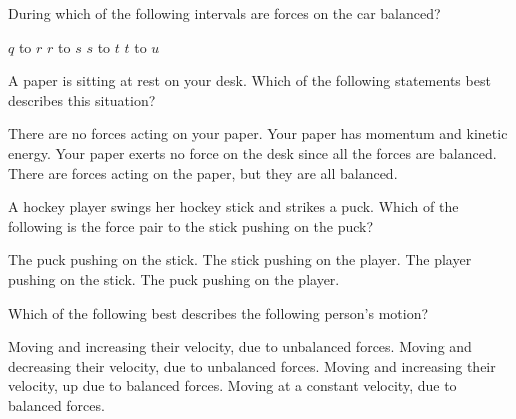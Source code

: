 \documentclass[answers]{exam}
\begin{document}
\begin{questions}
During which of the following intervals are forces on the car balanced?

\begin{randomizeoneparchoices}[norandomize]
    \choice $q$ to $r$
    \choice $r$ to $s$
    \correctchoice $s$ to $t$
    \choice $t$ to $u$
\end{randomizeoneparchoices}

\question 
A paper is sitting at rest on your desk.  Which of the following statements best describes this situation?

\begin{randomizechoices}[norandomize]
    \choice There are no forces acting on your paper.
    \choice Your paper has momentum and kinetic energy.
    \choice Your paper exerts no force on the desk since all the forces are balanced.
    \correctchoice There are forces acting on the paper, but they are all balanced.
\end{randomizechoices}

\question
A hockey player swings her hockey stick and strikes a puck.  Which of the following is the force pair to the stick pushing on the puck?

\begin{randomizechoices}[norandomize]
    \correctchoice The puck pushing on the stick.
    \choice The stick pushing on the player.
    \choice The player pushing on the stick.
    \choice The puck pushing on the player.
\end{randomizechoices}

\clearpage
\question 
Which of the following best describes the following person's motion?


\begin{center}
\end{center}

\begin{randomizechoices}[norandomize]
    \correctchoice Moving and increasing their velocity, due to unbalanced forces.
    \choice Moving and decreasing their velocity, due to unbalanced forces.
    \choice Moving and increasing their velocity, up due to balanced forces.
    \choice Moving at a constant velocity, due to balanced forces.
\end{randomizechoices}


\end{questions}
\end{document}
